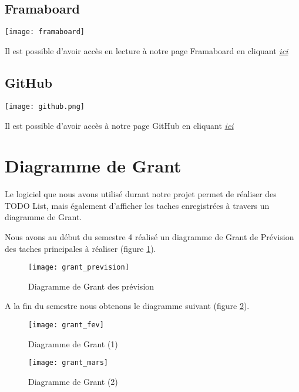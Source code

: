 ~\\
~\\

\subsection{Framaboard}
\begin{center}
\texttt{[image: framaboard]}
\end{center}
Il est possible d'avoir accès en lecture à notre page Framaboard en cliquant  \textit{\href{https://smart.framaboard.org/?controller=board&action=readonly&token=ab1e20bb26472df067dc24cbd84d9b28eea71bfd68bdea07ab5a9b555ce0}{ici}}

\subsection{GitHub}
\begin{center}
\texttt{[image: github.png]}
\end{center}
Il est possible d'avoir accès à notre page GitHub en cliquant  \textit{\href{https://github.com/magichal/SMART}{ici}}


\newpage



\section{Diagramme de Grant}

Le logiciel que nous avons utilisé durant notre projet permet de réaliser des TODO List, mais également d'afficher les taches enregistrées à travers un diagramme de Grant.

Nous avons au début du semestre 4 réalisé un diagramme de Grant de Prévision des taches principales à réaliser (figure \ref{fig:grant_pre}).

\begin{figure}[h]
  \centering
  \texttt{[image: grant\_prevision]}
  \caption{Diagramme de Grant des prévision}
  \label{fig:grant_pre}
\end{figure}


A la fin du semestre nous obtenons le diagramme suivant (figure \ref{fig:grant_fev}).
\begin{figure}[h]
  \centering
  \texttt{[image: grant\_fev]}
  \caption{Diagramme de Grant (1)}
  \label{fig:grant_fev}
\end{figure}
\begin{figure}[h]
  \centering
  \texttt{[image: grant\_mars]}
  \caption{Diagramme de Grant (2)}
  \label{fig:grant_mars}
\end{figure}


